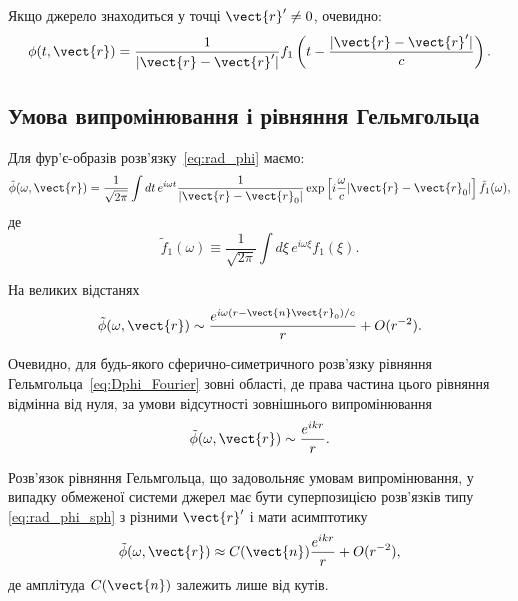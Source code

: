 Якщо джерело знаходиться у точці $\vect{r}' \neq 0$, очевидно:
\begin{equation}\label{eq:rad_phi}
	\phi(t, \vect{r}) = \frac1{|\vect{r} - \vect{r}'|} f_1\left( t - \frac{|\vect{r} - \vect{r}'|}c \right).
\end{equation}

\subsection*{Умова випромінювання і рівняння Гельмгольца}


Для фур'є-образів розв’язку~\eqref{eq:rad_phi} маємо:
\begin{equation}
	\tilde{\phi} (\omega, \vect{r}) = \frac{1}{\sqrt{2\pi}} \int dt \, e^{i\omega t} \frac{1}{|\vect{r} - \vect{r}_0|}
	\exp \left[ i \frac{\omega}{c} |\vect{r} - \vect{r}_0| \right] \tilde{f}_1(\omega),
\end{equation}
де
\begin{equation}
	\tilde{f}_1 (\omega) \equiv \frac{1}{\sqrt{2\pi}} \int d\xi \, e^{i\omega \xi} f_1(\xi).
\end{equation}

На великих відстанях
\begin{equation}
	\tilde{\phi} (\omega, \vect{r}) \sim \frac{e^{i\omega (r - \vect{n} \vect{r}_0)/c}}{r} + O(r^{-2}).
\end{equation}

Очевидно, для будь-якого сферично-симетричного розв’язку рівняння Гельмгольца~\eqref{eq:Dphi_Fourier} зовні області, де права частина цього рівняння
відмінна від нуля, за
умови відсутності зовнішнього випромінювання
\begin{equation}\label{eq:rad_phi_sph}
	\tilde{\phi} (\omega, \vect{r}) \sim \frac{e^{ikr}}{r}.
\end{equation}

Розв’язок рівняння Гельмгольца, що задовольняє умовам випромінювання, у випадку обмеженої системи джерел має бути суперпозицією розв’язків типу
\eqref{eq:rad_phi_sph} з
різними $\vect{r}'$ і мати асимптотику
\begin{equation}
	\tilde{\phi} (\omega, \vect{r}) \approx C(\vect{n}) \frac{e^{ikr}}{r} + O(r^{-2}),
\end{equation}
де амплітуда $C(\vect{n}) $ залежить лише від кутів.


